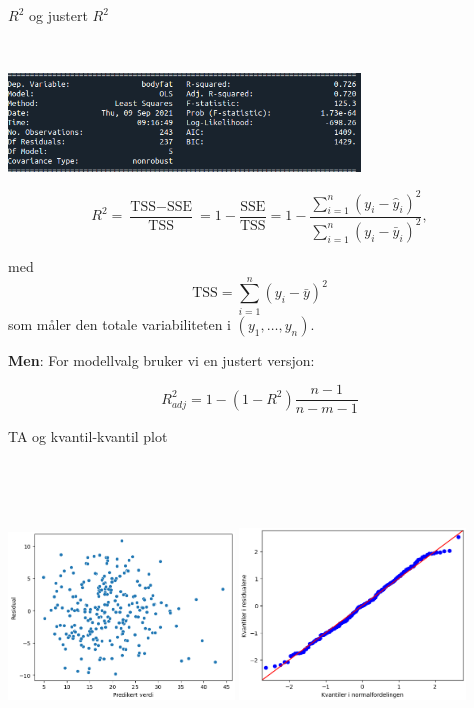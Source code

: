 \documentclass[10pt,ignorenonframetext,]{beamer}
\begin{document}
\begin{frame}

\begin{block}{\(R^2\) og justert \(R^2\)}

\(~\)

\includegraphics[width=0.7\textwidth,height=\textheight]{ols_result_all_header.png}

\[R^2 = \frac{\text{TSS}-\text{SSE}}{\text{TSS}}= 1-\frac{\text{SSE}}{\text{TSS}}=1-\frac{\sum_{i=1}^n(y_i-\hat{y}_i)^2}{\sum_{i=1}^n(y_i-\bar{y}_i)^2}, \]

med \[\text{TSS} = \sum_{i=1}^n (y_i - \bar{y})^2\] som måler den totale
variabiliteten i \((y_1,\ldots , y_n)\).

\vspace{2mm}

\textbf{Men}: For modellvalg bruker vi en justert versjon:

\[R^2_{adj} = 1-(1-R^2 )\frac{n-1}{n-m-1}\]

\end{block}

\end{frame}

\begin{frame}

\begin{block}{TA og kvantil-kvantil plot}

\(~\)

\(~\)

\includegraphics[width=0.45\textwidth,height=\textheight]{ta2.png}
\includegraphics[width=0.45\textwidth,height=\textheight]{qq2.png}

\end{block}

\end{frame}
\end{document}
